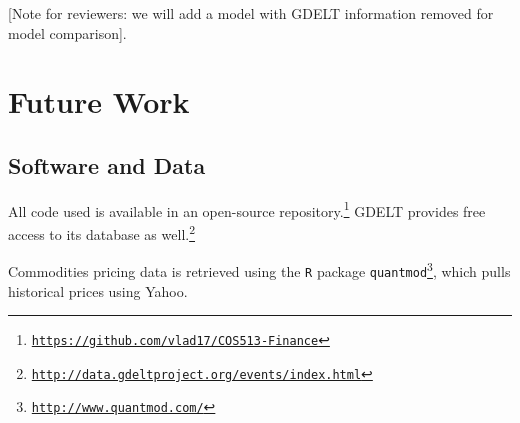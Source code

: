 \documentclass{article}
\begin{document}
[Note for reviewers: we will add a model with GDELT information removed for model comparison].

\section{Future Work}



\subsection{Software and Data}

All code used is available in an open-source repository.\footnote{\hyperref[https://github.com/vlad17/COS513-Finance]{\texttt{https://github.com/vlad17/COS513-Finance}}} GDELT provides free access to its database as well.\footnote{ \hyperref[http://data.gdeltproject.org/events/index.html]{\texttt{http://data.gdeltproject.org/events/index.html}}}

Commodities pricing data is retrieved using the \texttt{R} package \texttt{quantmod}\footnote{\hyperref[http://www.quantmod.com/]{\texttt{http://www.quantmod.com/}}}, which pulls historical prices using Yahoo.





\end{document}
